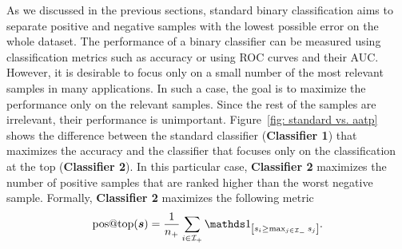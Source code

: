 As we discussed in the previous sections, standard binary classification aims to separate positive and negative samples with the lowest possible error on the whole dataset. The performance of a binary classifier can be measured using classification metrics such as accuracy or using ROC curves and their AUC. However, it is desirable to focus only on a small number of the most relevant samples in many applications. In such a case, the goal is to maximize the performance only on the relevant samples. Since the rest of the samples are irrelevant, their performance is unimportant. Figure~\ref{fig: standard vs. aatp} shows the difference between the standard classifier (\textbf{Classifier 1}) that maximizes the accuracy and the classifier that focuses only on the classification at the top (\textbf{Classifier 2}). In this particular case, \textbf{Classifier 2} maximizes the number of positive samples that are ranked higher than the worst negative sample. Formally, \textbf{Classifier 2} maximizes the following metric
\begin{equation}\label{eq: metric pos at top}
  \postop(\bm{s}) = \frac{1}{\npos} \sum_{i \in \Ipos} \Iverson{s_i \geq \max_{j \in \Ineg}s_j}.
\end{equation}
